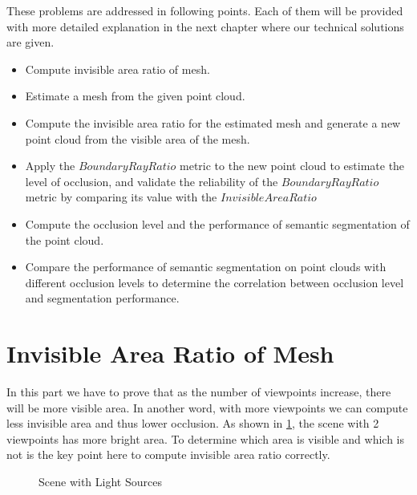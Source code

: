 \documentclass[11pt, a4paper,oneside,chapterprefix=false]{scrbook}
\begin{document}
\vspace{10pt}

These problems are addressed in following points. Each of them will be provided with more detailed explanation in the next chapter where our technical solutions are given.

\begin{itemize}
    \item Compute invisible area ratio of mesh.
    \item Estimate a mesh from the given point cloud.
    \item Compute the invisible area ratio for the estimated mesh and generate a new point cloud from the visible area of the mesh.
    \item Apply the ${BoundaryRayRatio}$ metric to the new point cloud to estimate the level of occlusion, and validate the reliability of the ${BoundaryRayRatio}$ metric by comparing its value with the ${InvisibleAreaRatio}$
    \item Compute the occlusion level and the performance of semantic segmentation of the point cloud.
    \item Compare the performance of semantic segmentation on point clouds with different occlusion levels to determine the correlation between occlusion level and segmentation performance.
\end{itemize}


\section{Invisible Area Ratio of Mesh} \label{sec:invisible area ratio of mesh}

In this part we have to prove that as the number of viewpoints increase, there will be more visible area. In another word, with more viewpoints we can compute less invisible area and thus lower occlusion. As shown in \ref{fig:scene with light sources}, the scene with 2 viewpoints has more bright area. To determine which area is visible and which is not is the key point here to compute invisible area ratio correctly.

\begin{figure}[htp]
    \centering
     \hfill
    \caption{Scene with Light Sources}
    \label{fig:scene with light sources}
\end{figure}
\end{document}
